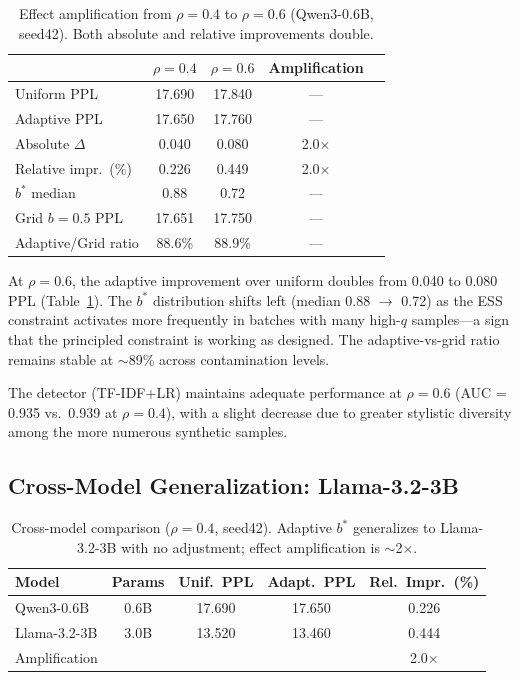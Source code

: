 \documentclass[11pt,a4paper]{article}
\newcommand{\bstar}{b^{*}}
\begin{document}
\begin{table}[t]
\centering
\small
\caption{Effect amplification from $\rho{=}0.4$ to $\rho{=}0.6$ (Qwen3-0.6B, seed42). Both absolute and relative improvements double.}
\label{tab:effect_amplification}
\begin{tabular}{lcccc}
\toprule
& $\rho{=}0.4$ & $\rho{=}0.6$ & Amplification \\
\midrule
Uniform PPL & 17.690 & 17.840 & --- \\
Adaptive PPL & 17.650 & 17.760 & --- \\
Absolute $\Delta$ & 0.040 & 0.080 & 2.0$\times$ \\
Relative impr.\ (\%) & 0.226 & 0.449 & 2.0$\times$ \\
$\bstar$ median & 0.88 & 0.72 & --- \\
\midrule
Grid $b{=}0.5$ PPL & 17.651 & 17.750 & --- \\
Adaptive/Grid ratio & 88.6\% & 88.9\% & --- \\
\bottomrule
\end{tabular}
\end{table}

At $\rho{=}0.6$, the adaptive improvement over uniform doubles from 0.040 to 0.080 PPL (Table~\ref{tab:effect_amplification}).
The $\bstar$ distribution shifts left (median 0.88 $\to$ 0.72) as the ESS constraint activates more frequently in batches with many high-$q$ samples---a sign that the principled constraint is working as designed.
The adaptive-vs-grid ratio remains stable at $\sim$89\% across contamination levels.

The detector (TF-IDF+LR) maintains adequate performance at $\rho{=}0.6$ (AUC = 0.935 vs.\ 0.939 at $\rho{=}0.4$), with a slight decrease due to greater stylistic diversity among the more numerous synthetic samples.

\subsection{Cross-Model Generalization: Llama-3.2-3B}
\label{sec:cross_model}

\begin{table}[t]
\centering
\small
\caption{Cross-model comparison ($\rho{=}0.4$, seed42). Adaptive $\bstar$ generalizes to Llama-3.2-3B with no adjustment; effect amplification is $\sim$2$\times$.}
\label{tab:cross_model}
\begin{tabular}{lcccc}
\toprule
Model & Params & Unif.\ PPL & Adapt.\ PPL & Rel.\ Impr.\ (\%) \\
\midrule
Qwen3-0.6B & 0.6B & 17.690 & 17.650 & 0.226 \\
Llama-3.2-3B & 3.0B & 13.520 & 13.460 & 0.444 \\
\midrule
Amplification & & & & 2.0$\times$ \\
\bottomrule
\end{tabular}
\end{table}
\end{document}
